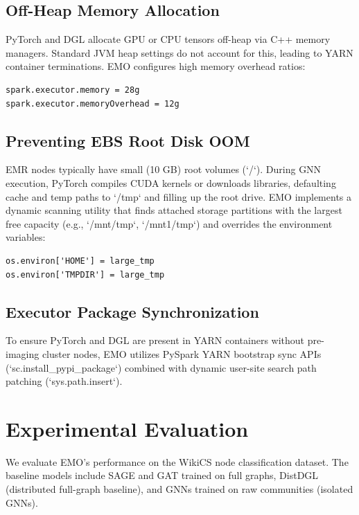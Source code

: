 \documentclass[conference,compsoc]{IEEEtran}
\begin{document}
\subsection{Off-Heap Memory Allocation}
PyTorch and DGL allocate GPU or CPU tensors off-heap via C++ memory managers. Standard JVM heap settings do not account for this, leading to YARN container terminations. EMO configures high memory overhead ratios:
\begin{lstlisting}[basicstyle=\footnotesize\ttfamily,columns=fullflexible]
spark.executor.memory = 28g
spark.executor.memoryOverhead = 12g
\end{lstlisting}

\subsection{Preventing EBS Root Disk OOM}
EMR nodes typically have small (10 GB) root volumes (`/`). During GNN execution, PyTorch compiles CUDA kernels or downloads libraries, defaulting cache and temp paths to `/tmp` and filling up the root drive. EMO implements a dynamic scanning utility that finds attached storage partitions with the largest free capacity (e.g., `/mnt/tmp`, `/mnt1/tmp`) and overrides the environment variables:
\begin{lstlisting}[basicstyle=\footnotesize\ttfamily,columns=fullflexible]
os.environ['HOME'] = large_tmp
os.environ['TMPDIR'] = large_tmp
\end{lstlisting}

\subsection{Executor Package Synchronization}
To ensure PyTorch and DGL are present in YARN containers without pre-imaging cluster nodes, EMO utilizes PySpark YARN bootstrap sync APIs (`sc.install_pypi_package`) combined with dynamic user-site search path patching (`sys.path.insert`).

\section{Experimental Evaluation}
We evaluate EMO's performance on the WikiCS node classification dataset. The baseline models include SAGE and GAT trained on full graphs, DistDGL (distributed full-graph baseline), and GNNs trained on raw communities (isolated GNNs).
\end{document}
